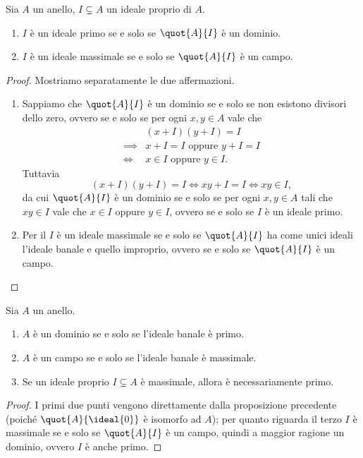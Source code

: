 \begin{proposition}
    \label{prop:primo_sse_dom/max_sse_campo}
    Sia $A$ un anello, $I \subsetneq A$ un ideale proprio di $A$.
    \begin{enumerate}[label={(\arabic*)}]
        \item $I$ è un ideale primo se e solo se $\quot{A}{I}$ è un dominio.
        \item $I$ è un ideale massimale se e solo se $\quot{A}{I}$ è un campo.
    \end{enumerate}
\end{proposition}
\begin{proof}
    Mostriamo separatamente le due affermazioni.
    \begin{enumerate}[label={(\arabic*)}]
        \item Sappiamo che $\quot{A}{I}$ è un dominio se e solo se non esistono divisori dello zero, ovvero se e solo se per ogni $x, y \in A$ vale che \begin{align*}
            &(x + I)(y + I) = I \\
            \implies &x + I = I \text{ oppure } y + I = I \\
            \iff &x \in I \text{ oppure } y \in I. 
        \end{align*} Tuttavia \[
            (x + I)(y + I) = I \iff xy + I = I \iff xy \in I,   
        \] da cui $\quot{A}{I}$ è un dominio se e solo se per ogni $x, y \in A$ tali che $xy \in I$ vale che $x \in I$ oppure $y \in I$, ovvero se e solo se $I$ è un ideale primo.
        \item Per il  $I$ è un ideale massimale se e solo se $\quot{A}{I}$ ha come unici ideali l'ideale banale e quello improprio, ovvero se e solo se $\quot{A}{I}$ è un campo. \qedhere
    \end{enumerate}
\end{proof}

\begin{corollary}
    \label{cor:dom_sse_banale-primo/campo_sse_banale-max}
    Sia $A$ un anello. \begin{enumerate}
        \item $A$ è un dominio se e solo se l'ideale banale è primo.
        \item $A$ è un campo se e solo se l'ideale banale è massimale.
        \item Se un ideale proprio $I \subsetneq A$ è massimale, allora è necessariamente primo.
    \end{enumerate}
\end{corollary}
\begin{proof}
    I primi due punti vengono direttamente dalla proposizione precedente (poiché $\quot{A}{\ideal{0}}$ è isomorfo ad $A$); per quanto riguarda il terzo $I$ è massimale se e solo se $\quot{A}{I}$ è un campo, quindi a maggior ragione un dominio, ovvero $I$ è anche primo.
\end{proof}

